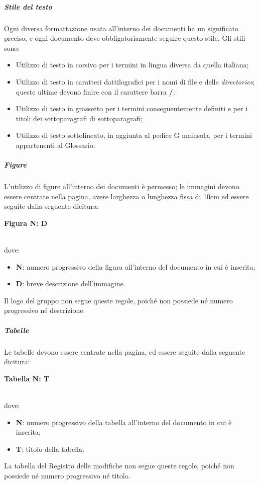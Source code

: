 \documentclass[../norme-di-progetto.tex]{subfiles}
\begin{document}
\subparagraph{Stile del testo}
Ogni diversa formattazione usata all'interno dei documenti ha un significato preciso, e ogni documento deve obbligatoriamente seguire questo stile. Gli stili sono:
\begin{itemize}
  \item Utilizzo di testo in corsivo per i termini in lingua diversa da quella italiana;
  \item Utilizzo di testo in caratteri dattilografici per i nomi di file e delle \textit{directories}; queste ultime devono finire con il carattere barra \textbf{/};
  \item Utilizzo di testo in grassetto per i termini conseguentemente definiti e per i titoli dei sottoparagrafi di sottoparagrafi;
  \item Utilizzo di testo sottolineato, in aggiunta al pedice G maiusola, per i termini appartenenti al Glossario.
\end{itemize}

\subparagraph{Figure}
L'utilizzo di figure all'interno dei documenti è permesso; le immagini devono essere centrate nella pagina, avere larghezza o lunghezza fissa di 10cm ed essere seguite dalla seguente dicitura: \\ \centerline{\textbf{Figura N: D}} \\ dove:
\begin{itemize}
  \item \textbf{N}: numero progressivo della figura all'interno del documento in cui è inserita;
  \item \textbf{D}: breve descrizione dell'immagine.
\end{itemize}
Il logo del gruppo non segue queste regole, poiché non possiede né numero progressivo né descrizione.

\subparagraph{Tabelle}
Le tabelle devono essere centrate nella pagina, ed essere seguite dalla seguente dicitura: \\ \centerline{\textbf{Tabella N: T}} \\ dove:
\begin{itemize}
  \item \textbf{N}: numero progressivo della tabella all'interno del documento in cui è inserita;
  \item \textbf{T}: titolo della tabella.
\end{itemize}
La tabella del Registro delle modifiche non segue queste regole, poiché non possiede né numero progressivo né titolo.
\end{document}
